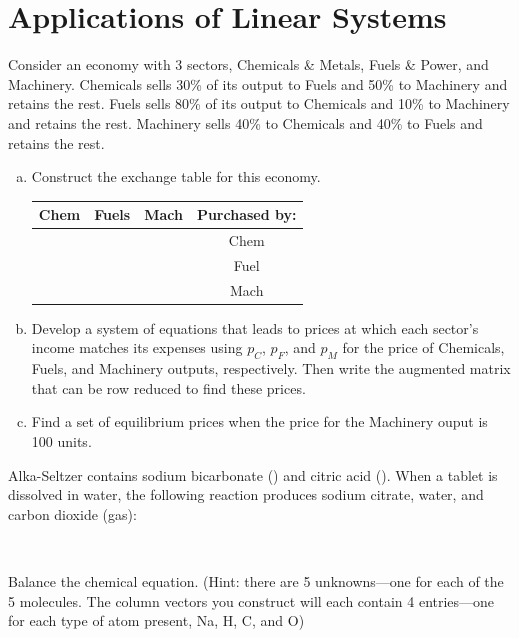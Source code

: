 \newpage


\section{Applications of Linear Systems}
\names[4]


\begin{exercise} %
	Consider an economy with 3 sectors, Chemicals \& Metals, Fuels \& Power, and Machinery. Chemicals sells 30\% of its output to Fuels and 50\% to Machinery and retains the rest. Fuels sells 80\% of its output to Chemicals and 10\% to Machinery and retains the rest. Machinery sells 40\% to Chemicals and 40\% to Fuels and retains the rest.
	\begin{enumerate}[(a)]
		\item Construct the exchange table for this economy. \par
			\renewcommand{\arraystretch}{2}
			\begin{tabular}{|c|c|c|c|}
				\hline
				\textbf{Chem}	& \textbf{Fuels}	& \textbf{Mach}	& \textbf{Purchased by:} \\ \hline
				&	&	& Chem \\ \hline
				&	&	& Fuel \\ \hline
				&	&	& Mach \\ \hline
			\end{tabular}
		\item Develop a system of equations that leads to prices at which each sector's income matches its expenses using $p_C$, $p_F$, and $p_M$ for the price of Chemicals, Fuels, and Machinery outputs, respectively. Then write the augmented matrix that can be row reduced to find these prices.
		\vfill
		\item Find a set of equilibrium prices when the price for the Machinery ouput is 100 units.
		\vfill
	\end{enumerate}
\end{exercise}


\newpage


\begin{exercise} %
	Alka-Seltzer contains sodium bicarbonate () and citric acid (). When a tablet is dissolved in water, the following reaction produces sodium citrate, water, and carbon dioxide (gas):
	\begin{center}
		 \\
	\end{center}
	Balance the chemical equation. (Hint: there are 5 unknowns---one for each of the 5 molecules. The column vectors you construct will each contain 4 entries---one for each type of atom present, Na, H, C, and O)
\end{exercise}
\vfill

